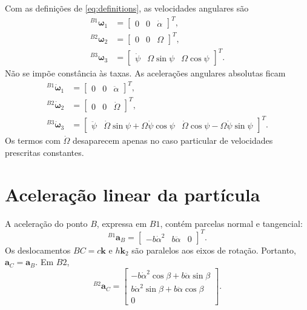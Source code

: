 \documentclass[11pt,a4paper]{article}
\newcommand{\bvec}[1]{\bm{#1}}
\newcommand{\vct}[2]{{}^{#1}\!\bvec{#2}}
\begin{document}
Com as definições de \cref{eq:definitions}, as velocidades angulares são
\begin{align}
\vct{B1}{\omega}_1&=\begin{bmatrix}0&0&\dot\alpha\end{bmatrix}^{T},\\
\vct{B2}{\omega}_2&=\begin{bmatrix}0&0&\Omega\end{bmatrix}^{T},\\
\vct{B3}{\omega}_3&=
\begin{bmatrix}\dot\psi&\Omega\sin\psi&\Omega\cos\psi\end{bmatrix}^{T}.
\end{align}
Não se impõe constância às taxas. As acelerações angulares absolutas ficam
\begin{align}
\vct{B1}{\dot\omega}_1&=\begin{bmatrix}0&0&\ddot\alpha\end{bmatrix}^{T},\\
\vct{B2}{\dot\omega}_2&=\begin{bmatrix}0&0&\dot\Omega\end{bmatrix}^{T},\\
\vct{B3}{\dot\omega}_3&=
\begin{bmatrix}
\ddot\psi &
\dot\Omega\sin\psi+\Omega\dot\psi\cos\psi &
\dot\Omega\cos\psi-\Omega\dot\psi\sin\psi
\end{bmatrix}^{T}.
\end{align}
Os termos com $\dot\Omega$ desaparecem apenas no caso particular de velocidades
prescritas constantes.
\section{Aceleração linear da partícula}

A aceleração do ponto $B$, expressa em $B1$, contém parcelas normal e
tangencial:
\begin{equation}
\vct{B1}{a}_B=
\begin{bmatrix}-b\dot\alpha^2&b\ddot\alpha&0\end{bmatrix}^{T}.
\end{equation}
Os deslocamentos $BC=c\bvec k$ e $h\bvec k_2$ são paralelos aos eixos de
rotação. Portanto, $\bvec a_C=\bvec a_B$. Em $B2$,
\begin{equation}
\vct{B2}{a}_C=
\begin{bmatrix}
-b\dot\alpha^2\cos\beta+b\ddot\alpha\sin\beta\\
b\dot\alpha^2\sin\beta+b\ddot\alpha\cos\beta\\0
\end{bmatrix}.
\end{equation}
\end{document}
